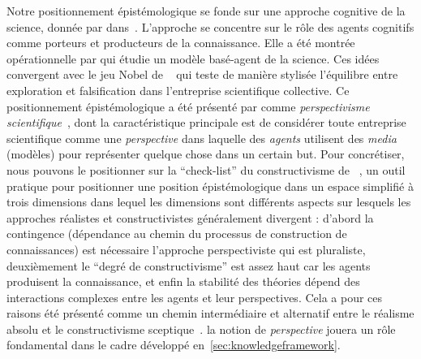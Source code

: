 {Notre positionnement épistémologique se fonde sur une approche cognitive de la science, donnée par  dans~\cite{giere2010explaining}. L'approche se concentre sur le rôle des agents cognitifs comme porteurs et producteurs de la connaissance. Elle a été montrée opérationnelle par \cite{giere2010agent} qui étudie un modèle basé-agent de la science. Ces idées convergent avec le jeu Nobel de ~\cite{chavalarias2016s} qui teste de manière stylisée l'équilibre entre exploration et falsification dans l'entreprise scientifique collective. Ce positionnement épistémologique a été présenté par  comme \emph{perspectivisme scientifique}~\cite{giere2010scientific}, dont la caractéristique principale est de considérer toute entreprise scientifique comme une \emph{perspective} dans laquelle des \emph{agents} utilisent des \emph{media} (modèles) pour représenter quelque chose dans un certain but. Pour concrétiser, nous pouvons le positionner sur la ``check-list'' du constructivisme de ~\cite{hacking1999social}, un outil pratique pour positionner une position épistémologique dans un espace simplifié à trois dimensions dans lequel les dimensions sont différents aspects sur lesquels les approches réalistes et constructivistes généralement divergent : d'abord la contingence (dépendance au chemin du processus de construction de connaissances) est nécessaire l'approche perspectiviste qui est pluraliste, deuxièmement le ``degré de constructivisme'' est assez haut car les agents produisent la connaissance, et enfin la stabilité des théories dépend des interactions complexes entre les agents et leur perspectives. Cela a pour ces raisons été présenté comme un chemin intermédiaire et alternatif entre le réalisme absolu et le constructivisme sceptique~\cite{brown2009models}. la notion de \emph{perspective} jouera un rôle fondamental dans le cadre développé en~\ref{sec:knowledgeframework}.
}





